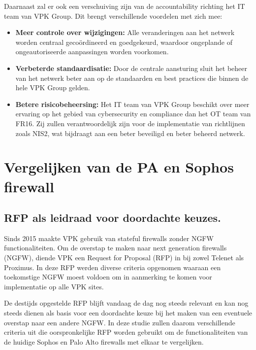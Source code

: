 \vspace{5mm}
Daarnaast zal er ook een verschuiving zijn van de accountability richting het IT team van VPK Group. Dit brengt verschillende voordelen met zich mee:

\begin{itemize}
    \item \textbf{Meer controle over wijzigingen:} Alle veranderingen aan het netwerk worden centraal gecoördineerd en goedgekeurd, waardoor ongeplande of ongeautoriseerde aanpassingen worden voorkomen.

    \item \textbf{Verbeterde standaardisatie:} Door de centrale aansturing sluit het beheer van het netwerk beter aan op de standaarden en best practices die binnen de hele VPK Group gelden.
    
    \item \textbf{Betere risicobeheersing: }Het IT team van VPK Group beschikt over meer ervaring op het gebied van cybersecurity en compliance dan het OT team van FR16. Zij zullen verantwoordelijk zijn voor de implementatie van richtlijnen zoals NIS2, wat bijdraagt aan een beter beveiligd en beter beheerd netwerk.
\end{itemize}

\chapter{Vergelijken van de PA en Sophos firewall}


\section{RFP als leidraad voor doordachte keuzes.}
Sinds 2015 maakte VPK gebruik van stateful firewalls zonder NGFW functionaliteiten. Om de overstap te maken naar next generation firewalls (NGFW), diende VPK een Request for Proposal (RFP) in bij zowel Telenet als Proximus. In deze RFP werden diverse criteria opgenomen waaraan een toekomstige NGFW moest voldoen om in aanmerking te komen voor implementatie op alle VPK sites.

\vspace{5mm}
De destijds opgestelde RFP blijft vandaag de dag nog steeds relevant en kan nog steeds dienen als basis voor een doordachte keuze bij het maken van een eventuele overstap naar een andere NGFW. In deze studie zullen daarom verschillende criteria uit die oorspronkelijke RFP worden gebruikt om de functionaliteiten van de huidige Sophos en Palo Alto firewalls met elkaar te vergelijken.




